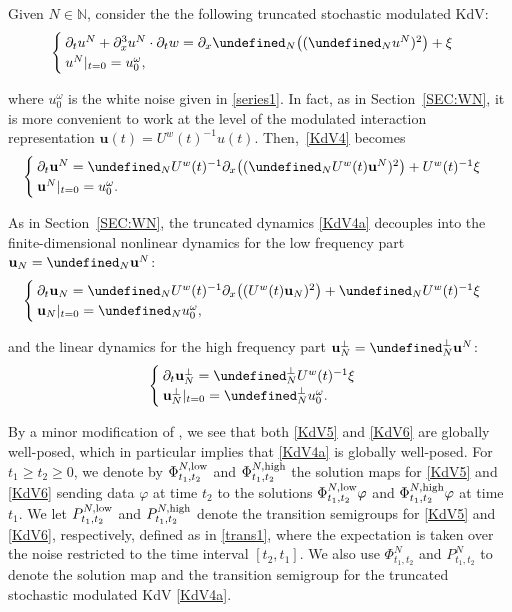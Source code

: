\documentclass[letterpaper, 11pt,  reqno]{amsart}
\newcommand{\1}{\hspace{0.5mm}\text{I}\hspace{0.5mm}}
\newcommand{\noi}{\noindent}
\let\P= \undefined
\newcommand{\P}{\mathbf{P}}
\newcommand{\low}{\textup{low}}
\newcommand{\high}{\textup{high}}
\newcommand{\dx}{\partial_x}
\newcommand{\dt}{\partial_t}
\renewcommand{\o}{\omega}
\newcommand{\N}{\mathbb{N}}
\newcommand{\uw}{U^w}
\newcommand{\uu}{\mathbf{u}}
\numberwithin{equation}{section}
\numberwithin{theorem}{section}
\begin{document}
Given $N \in \N$, 
consider the 
the following truncated stochastic modulated KdV:
\begin{equation}
\label{KdV4}
\begin{cases}
\dt u^N+  \dx^3 u^N \cdot \dt w =\dx \P_N\big((\P_Nu^N)^2\big) +  \xi\\
u^N|_{t = 0} = u_0^\o, 
\end{cases}
\end{equation}

\noi
where $u_0^\o$ is the white noise given in \eqref{series1}.
In fact,
as in Section~\ref{SEC:WN}, 
 it is more convenient to work at the level of the modulated interaction representation
 $\uu(t) = \uw(t)^{-1} u(t)$.
Then,~\eqref{KdV4} becomes
\begin{equation}
\label{KdV4a}
\begin{cases}
\dt \uu^N = \P_N\uw(t)^{-1} \dx\big( (\P_N \uw(t) \uu^N)^2\big) +  \uw(t)^{-1} \xi\\
\uu^N|_{t = 0} = u_0^\o.
\end{cases}
\end{equation}


\noi
As in Section~\ref{SEC:WN}, the truncated dynamics \eqref{KdV4a}
 decouples into 
 the finite-dimensional nonlinear dynamics for the low frequency part 
 $\uu_N = \P_{N} \uu^N$:
\begin{align}
\begin{cases}
\dt \uu_N = \P_N\uw(t)^{-1} \dx\big( ( \uw(t) \uu_N)^2\big)
+ \P_N  \uw(t)^{-1} \xi\\
\uu_N|_{t = 0} = \P_{N} u_0^\o, 
\end{cases}
\label{KdV5}
\end{align}


\noi
and the linear dynamics for the high frequency part 
$\uu_N^\perp = \P_N^\perp \uu^N$:
\begin{align}
\begin{cases}
\dt \uu_N^\perp =  \P_N^\perp  \uw(t)^{-1} \xi \\
\uu_N^\perp |_{t = 0} = \P_{N}^\perp u_0^\o.
\end{cases}
\label{KdV6}
\end{align}



\noi
By a minor modification of \cite[Lemma 2.1]{OQS}, 
we see  that both \eqref{KdV5} and \eqref{KdV6}
are globally well-posed, 
 which in particular implies that \eqref{KdV4a} is globally well-posed.
For $t_1 \ge t_2 \ge 0$,
we denote by 
 $\Phi^{N, \low}_{t_1, t_2}$
 and $\Phi^{N, \high}_{t_1, t_2}$  
 the solution maps for \eqref{KdV5} and \eqref{KdV6}
sending data $\varphi$  at time $t_2$ to the solutions 
$\Phi^{N, \low}_{t_1, t_2}\varphi$
and $\Phi^{N, \high}_{t_1, t_2}\varphi$ at time $t_1$.
We let $P^{N,\low}_{t_1, t_2}$
and $P^{N,\high}_{t_1, t_2}$ denote the transition semigroups
for \eqref{KdV5} and \eqref{KdV6}, respectively, 
defined as in \eqref{trans1}, where the expectation 
is taken over the noise restricted to the time interval $[t_2, t_1]$.
We also use 
$\Phi^{N}_{t_1, t_2}$
and $P^{N}_{t_1, t_2}$
to denote the solution map and the transition semigroup for the truncated
stochastic modulated KdV \eqref{KdV4a}.
\end{document}
